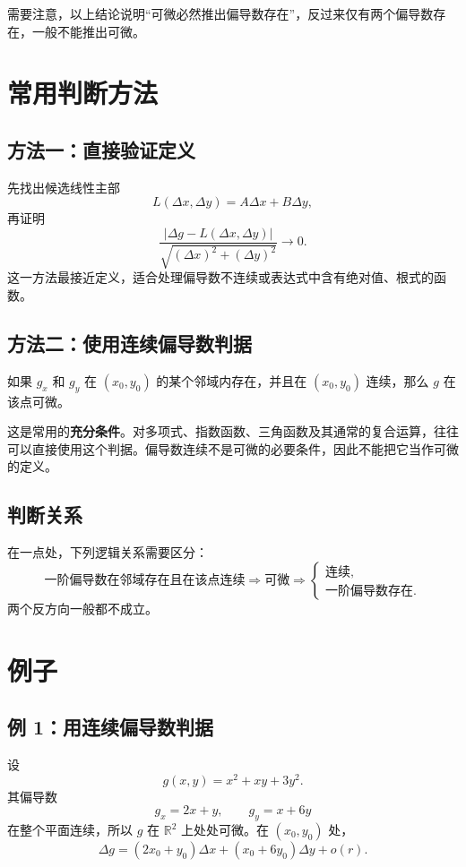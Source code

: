 \documentclass[UTF8,11pt]{ctexart}
\newcommand{\R}{\mathbb{R}}
\newcommand{\abs}[1]{\left\lvert#1\right\rvert}
\begin{document}
需要注意，以上结论说明“可微必然推出偏导数存在”，反过来仅有两个偏导数存在，一般不能推出可微。

\section{常用判断方法}

\subsection*{方法一：直接验证定义}

先找出候选线性主部
\[
L(\Delta x,\Delta y)=A\Delta x+B\Delta y,
\]
再证明
\[
\frac{\abs{\Delta g-L(\Delta x,\Delta y)}}{
\sqrt{(\Delta x)^2+(\Delta y)^2}}
\longrightarrow0.
\]
这一方法最接近定义，适合处理偏导数不连续或表达式中含有绝对值、根式的函数。

\subsection*{方法二：使用连续偏导数判据}

如果 $g_x$ 和 $g_y$ 在 $(x_0,y_0)$ 的某个邻域内存在，并且在
$(x_0,y_0)$ 连续，那么 $g$ 在该点可微。

这是常用的\textbf{充分条件}。对多项式、指数函数、三角函数及其通常的复合运算，往往可以直接使用这个判据。偏导数连续不是可微的必要条件，因此不能把它当作可微的定义。

\subsection*{判断关系}

在一点处，下列逻辑关系需要区分：
\[
\text{一阶偏导数在邻域存在且在该点连续}
\Longrightarrow
\text{可微}
\Longrightarrow
\begin{cases}
\text{连续},\\
\text{一阶偏导数存在}.
\end{cases}
\]
两个反方向一般都不成立。

\section{例子}

\subsection*{例 1：用连续偏导数判据}

设
\[
g(x,y)=x^2+xy+3y^2.
\]
其偏导数
\[
g_x=2x+y,\qquad g_y=x+6y
\]
在整个平面连续，所以 $g$ 在 $\R^2$ 上处处可微。在
$(x_0,y_0)$ 处，
\[
\Delta g
=(2x_0+y_0)\Delta x+(x_0+6y_0)\Delta y
+o(r).
\]
\end{document}
